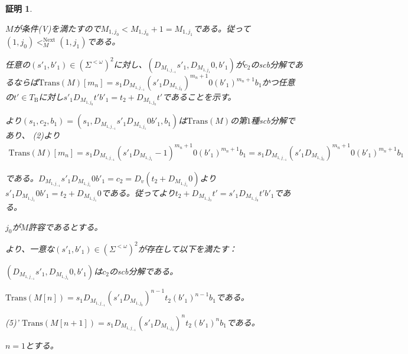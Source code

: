 \documentclass[dvipdfmx,uplatex]{jsarticle}
\theoremstyle{customnonumberbreakfortheorem}
\theoremstyle{customnonumberbreakforproof}
\newtheorem{hideableproof}{証明}
\begin{document}
\begin{hideableproof}
	\begin{indented}
		\item \(M\)が条件(V)を満たすので\(M_{1,j_0} < M_{1,j_0}+1 = M_{1,j_1}\)である。従って\((1,j_0) <_M^{\textrm{Next}} (1,j_1)\)である。
		\item 任意の\((s'_1,b'_1) \in (\Sigma^{< \omega})^2\)に対し、\((D_{M_{1,j_{-1}}} s'_1,D_{M_{1,j_1}} 0,b'_1)\)が\(c_2\)のscb分解であるならば\(\textrm{Trans}(M)[m_n] = s_1 D_{M_{1,j_{-1}}} (s'_1 D_{M_{1,j_0}})^{m_n+1} 0 (b'_1)^{m_n+1} b_1\)かつ任意の\(t' \in T_{\textrm{B}}\)に対し\(s'_1 D_{M_{1,j_0}} t' b'_1 = t_2 + D_{M_{1,j_0}} t'\)であることを示す。
		\item {}より\((s_1,c_2,b_1) = (s_1,D_{M_{1,j_{-1}}} s'_1 D_{M_{1,j_1}} 0 b'_1,b_1)\)は\(\textrm{Trans}(M)\)の第\(1\)種scb分解であり、 (2)より
		\begin{eqnarray*}
		\textrm{Trans}(M)[m_n] = s_1 D_{M_{1,j_{-1}}} (s'_1 D_{M_{1,j_1}}-1)^{m_n+1} 0 (b'_1)^{m_n+1} b_1 = s_1 D_{M_{1,j_{-1}}} (s'_1 D_{M_{1,j_0}})^{m_n+1} 0 (b'_1)^{m_n+1} b_1
		\end{eqnarray*}
		\item である。\(D_{M_{1,j_{-1}}} s'_1 D_{M_{1,j_1}} 0 b'_1 = c_2 = D_v(t_2 + D_{M_{1,j_1}} 0)\)より\(s'_1 D_{M_{1,j_1}} 0 b'_1 = t_2 + D_{M_{1,j_1}} 0\)である。従ってより\(t_2 + D_{M_{1,j_0}} t' = s'_1 D_{M_{1,j_0}} t' b'_1\)である。
		\item
		\item \(j_0\)が\(M\)許容であるとする。
		\begin{indented}
			\item {}より、一意な\((s'_1,b'_1) \in (\Sigma^{< \omega})^2\)が存在して以下を満たす：
			\begin{penumerate}
				\item \((D_{M_{1,j_{-1}}} s'_1,D_{M_{1,j_1}} 0,b'_1)\)は\(c_2\)のscb分解である。
				\setcounter{penumeratei}{4}
				\item \(\textrm{Trans}(M[n]) = s_1 D_{M_{1,j_{-1}}} (s'_1 D_{M_{1,j_0}})^{n-1} t_2 (b'_1)^{n-1} b_1\)である。
				\item[] (5)' \(\textrm{Trans}(M[n+1]) = s_1 D_{M_{1,j_{-1}}} (s'_1 D_{M_{1,j_0}})^n t_2 (b'_1)^n b_1\)である。
			\end{penumerate}
			\item \(n = 1\)とする。
			\begin{indented}

\end{indented}
\end{indented}
\end{indented}
\end{hideableproof}
\end{document}
